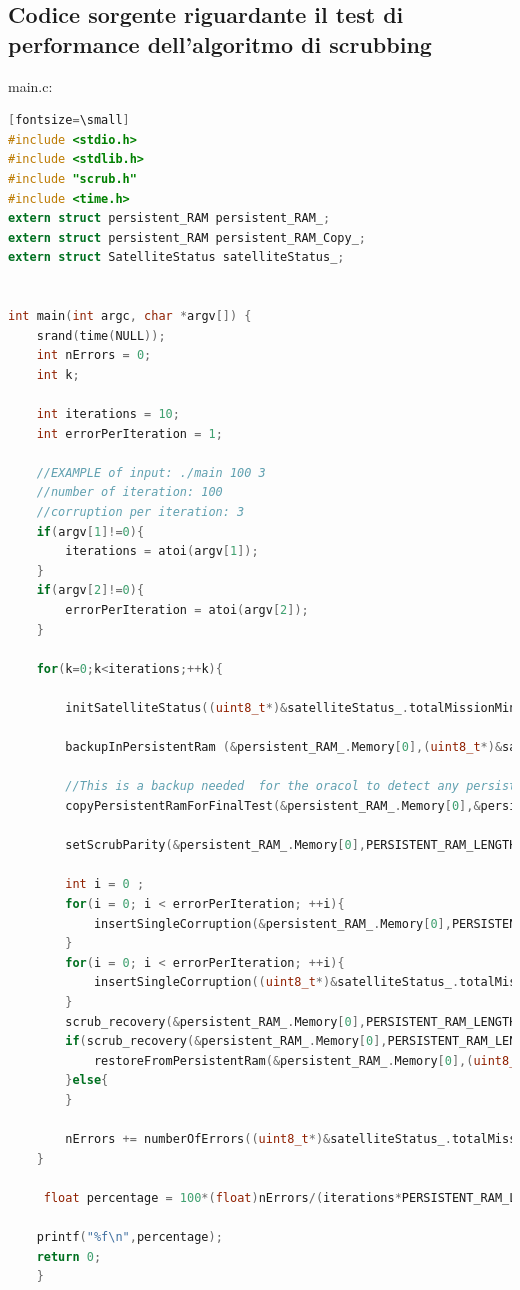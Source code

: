 \documentclass[LaM,binding=0.6cm]{../sapthesis}
\begin{document}
\subsection{Codice sorgente riguardante il test di performance dell'algoritmo di scrubbing}
main.c:
\begin{lstlisting}[language=c][fontsize=\small]
#include <stdio.h>
#include <stdlib.h>
#include "scrub.h"
#include <time.h>
extern struct persistent_RAM persistent_RAM_;
extern struct persistent_RAM persistent_RAM_Copy_;
extern struct SatelliteStatus satelliteStatus_;


int main(int argc, char *argv[]) {
    srand(time(NULL));
    int nErrors = 0;
    int k;

    int iterations = 10;
    int errorPerIteration = 1;
    
    //EXAMPLE of input: ./main 100 3
    //number of iteration: 100
    //corruption per iteration: 3
    if(argv[1]!=0){
    	iterations = atoi(argv[1]);
    }
    if(argv[2]!=0){
    	errorPerIteration = atoi(argv[2]);
    }
    
    for(k=0;k<iterations;++k){
    
        initSatelliteStatus((uint8_t*)&satelliteStatus_.totalMissionMinutes, PERSISTENT_RAM_LENGTH);
        
        backupInPersistentRam (&persistent_RAM_.Memory[0],(uint8_t*)&satelliteStatus_.totalMissionMinutes,PERSISTENT_RAM_LENGTH);
        
        //This is a backup needed  for the oracol to detect any persistent corruption in satelliteStatus
        copyPersistentRamForFinalTest(&persistent_RAM_.Memory[0],&persistent_RAM_Copy_.Memory[0],PERSISTENT_RAM_LENGTH);
        
        setScrubParity(&persistent_RAM_.Memory[0],PERSISTENT_RAM_LENGTH/8);

        int i = 0 ;
        for(i = 0; i < errorPerIteration; ++i){
            insertSingleCorruption(&persistent_RAM_.Memory[0],PERSISTENT_RAM_LENGTH,0);
        }
        for(i = 0; i < errorPerIteration; ++i){
            insertSingleCorruption((uint8_t*)&satelliteStatus_.totalMissionMinutes,PERSISTENT_RAM_LENGTH,0);
        }
        scrub_recovery(&persistent_RAM_.Memory[0],PERSISTENT_RAM_LENGTH/8);
        if(scrub_recovery(&persistent_RAM_.Memory[0],PERSISTENT_RAM_LENGTH/8)==0){
            restoreFromPersistentRam(&persistent_RAM_.Memory[0],(uint8_t*)&satelliteStatus_.totalMissionMinutes,PERSISTENT_RAM_LENGTH);
        }else{
        }

        nErrors += numberOfErrors((uint8_t*)&satelliteStatus_.totalMissionMinutes);
    }

     float percentage = 100*(float)nErrors/(iterations*PERSISTENT_RAM_LENGTH);

	printf("%f\n",percentage);
	return 0;
	}
\end{lstlisting}
\end{document}
